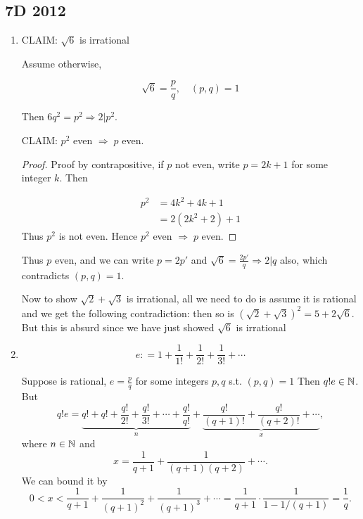 \documentclass[a4paper]{article}
\begin{document}
\subsection*{7D 2012}
	\begin{enumerate}
		\item 
			CLAIM: $ \sqrt{6} $ is irrational
		
			Assume otherwise,
			
			\[ \sqrt{6} = \frac{p}{q}, \quad (p,q) = 1 \]
			
			Then $ 6q^{2} = p^{2}  \Rightarrow 2 | p^{2} $. 
			
			CLAIM: $ p^{2} $ even $ \Rightarrow \; p $ even.
			
		\begin{proof}
				Proof by contrapositive, if $ p $ not even, write $ p = 2k + 1 $ for some integer $ k $. Then
			
			\begin{align*}
			p^2 & = 4k^2 + 4k + 1 \\
			& = 2 (2k^2 + 2) + 1
			\end{align*}
			Thus $ p^{2} $ is not even. Hence $ p^{2} $ even $ \Rightarrow \; p $ even.
		\end{proof}
			Thus $ p $ even, and we can write $ p = 2p' $ and $ \sqrt{6} = \frac{2p'}{q} \Rightarrow 2 | q $ also, which contradicts $ (p,q) = 1 $.

	
		Now to show $ \sqrt{2} + \sqrt{3} $ is irrational, all we need to do is assume it is rational and we get the following contradiction: then so is $ (\sqrt{2} + \sqrt{3})^{2} = 5 + 2 \sqrt{6} $. But this is absurd since we have just showed $ \sqrt{6} $ is irrational
	
		
	
	

	\item 
	
	\[ e : = 1 + \frac{1}{1!} + \frac{1}{2!} + \frac{1}{3!} + \cdots \]
	
		Suppose is rational, $e = \frac{p}{q}$ for some integers $ p,q $ s.t. $ (p,q) = 1 $  Then $q!e \in \mathbb{N}$. But
	\[
	q!e = \underbrace{q! + q! + \frac{q!}{2!} + \frac{q!}{3!} + \cdots + \frac{q!}{q!}}_{n} + \underbrace{\frac{q!}{(q + 1)!} + \frac{q!}{(q + 2)!} + \cdots}_{x},
	\]
	where $n \in \mathbb{N}$ and 
	\[
	x = \frac{1}{q + 1} + \frac{1}{(q + 1)(q + 2)} + \cdots.
	\]
	We can bound it by
	\[
	0 < x < \frac{1}{q+1} +\frac{1}{(q + 1)^2} + \frac{1}{(q + 1)^3} + \cdots = \frac{1}{q + 1}\cdot \frac{1}{1 - 1/(q + 1)} = \frac{1}{q}.
	\]
	

\end{enumerate}
\end{document}
